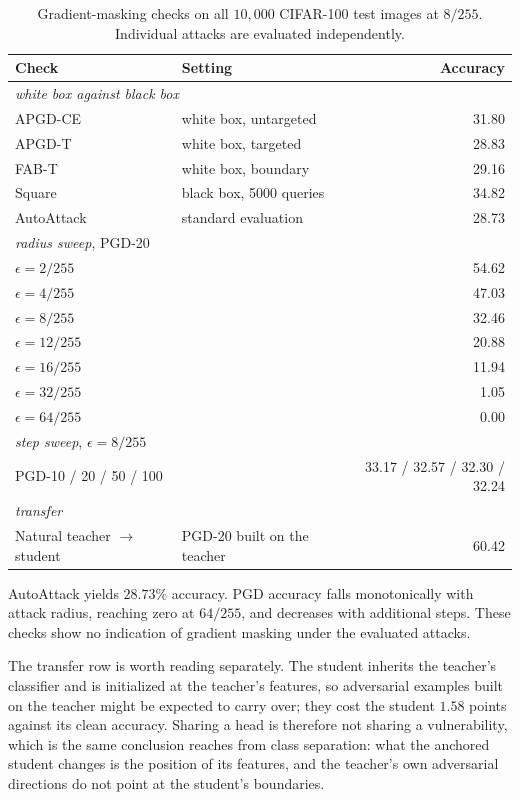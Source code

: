 \begin{table}[!htbp]
  \centering \small \setlength{\tabcolsep}{5pt}
  \caption{Gradient-masking checks on all $10{,}000$ CIFAR-100 test images at $8/255$.
  Individual attacks are evaluated independently.}
  \label{tab:gradmask}
  \begin{tabular}{llr}
    \toprule
    Check & Setting & Accuracy \\
    \midrule
    \multicolumn{3}{l}{\emph{white box against black box}} \\
    APGD-CE            & white box, untargeted & 31.80 \\
    APGD-T             & white box, targeted   & 28.83 \\
    FAB-T              & white box, boundary   & 29.16 \\
    Square             & black box, 5000 queries & 34.82 \\
    \midrule
    AutoAttack & standard evaluation & 28.73 \\
    \midrule
    \multicolumn{3}{l}{\emph{radius sweep}, PGD-20} \\
    $\epsilon = 2/255$  & & 54.62 \\
    $\epsilon = 4/255$  & & 47.03 \\
    $\epsilon = 8/255$  & & 32.46 \\
    $\epsilon = 12/255$ & & 20.88 \\
    $\epsilon = 16/255$ & & 11.94 \\
    $\epsilon = 32/255$ & & 1.05 \\
    $\epsilon = 64/255$ & & 0.00 \\
    \midrule
    \multicolumn{3}{l}{\emph{step sweep}, $\epsilon = 8/255$} \\
    PGD-10 / 20 / 50 / 100 & & 33.17 / 32.57 / 32.30 / 32.24 \\
    \midrule
    \multicolumn{3}{l}{\emph{transfer}} \\
    Natural teacher $\rightarrow$ student & PGD-20 built on the teacher & 60.42 \\
    \bottomrule
  \end{tabular}
\end{table}

AutoAttack yields $28.73\%$ accuracy. PGD accuracy falls monotonically with attack radius, reaching
zero at $64/255$, and decreases with additional steps. These checks show no indication of gradient
masking under the evaluated attacks.

The transfer row is worth reading separately. The student inherits the teacher's classifier and is
initialized at the teacher's features, so adversarial examples built on the teacher might be expected
to carry over; they cost the student $1.58$ points against its clean accuracy. Sharing a head is
therefore not sharing a vulnerability, which is the same conclusion  reaches from
class separation: what the anchored student changes is the position of its features, and the teacher's own
adversarial directions do not point at the student's boundaries.

